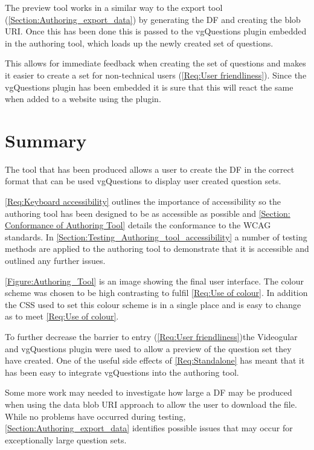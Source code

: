 The preview tool works in a similar way to the export tool (\autoref{Section:Authoring_export_data}) by generating the \gls{DF} and creating the \gls{blob} URI. Once this has been done this is passed to the \gls{vgQuestions} plugin embedded in the authoring tool, which loads up the newly created set of questions.

This allows for immediate feedback when creating the set of questions and makes it easier to create a set for non-technical users (\cref{Req:User friendliness}). Since the \gls{vgQuestions} plugin has been embedded it is sure that this will react the same when added to a website using the plugin.

\section{Summary}
\label{Section:Authoring_Conclusion}

The tool that has been produced allows a user to create the \gls{DF} in the correct format that can be used \gls{vgQuestions} to display user created question sets.

\cref{Req:Keyboard accessibility} outlines the importance of accessibility so the authoring tool has been designed to be as accessible as possible and \autoref{Section: Conformance of Authoring Tool} details the conformance to the \gls{WCAG} standards. In \autoref{Section:Testing_Authoring_tool_accessibility} a number of testing methods are applied to the authoring tool to demonstrate that it is accessible and outlined any further issues.

\autoref{Figure:Authoring_Tool} is an image showing the final user interface. The colour scheme was chosen to be high contrasting to fulfil \cref{Req:Use of colour}. In addition the \gls{CSS} used to set this colour scheme is in a single place and is easy to change as to meet \cref{Req:Use of colour}.

To further decrease the barrier to entry (\cref{Req:User friendliness})the \gls{Videogular} and \gls{vgQuestions} plugin were used to allow a preview of the question set they have created. One of the useful side effects of \cref{Req:Standalone} has meant that it has been easy to integrate \gls{vgQuestions} into the authoring tool.

Some more work may needed to investigate how large a \gls{DF} may be produced when using the data \gls{blob} URI approach to allow the user to download the file. While no problems have occurred during testing, \autoref{Section:Authoring_export_data} identifies possible issues that may occur for exceptionally large question sets.

